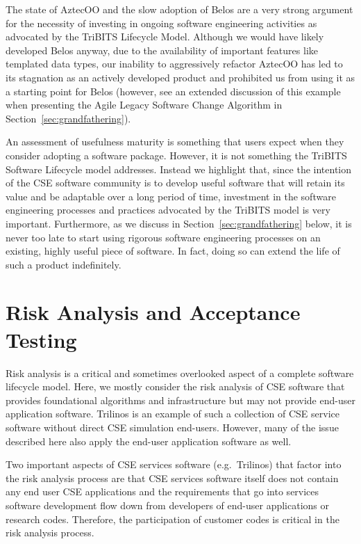 \documentclass[11pt]{SANDreport}
\begin{document}
The state of AztecOO and the slow adoption of Belos are a very strong
argument for the necessity of investing in ongoing software
engineering activities as advocated by the TriBITS Lifecycle Model.
Although we would have likely developed Belos anyway, due to the
availability of important features like templated data types, our
inability to aggressively refactor AztecOO has led to its stagnation
as an actively developed product and prohibited us from using it as a
starting point for Belos (however, see an extended discussion of this
example when presenting the Agile Legacy Software Change Algorithm in
Section~\ref{sec:grandfathering}).

An assessment of usefulness maturity is something that users expect
when they consider adopting a software package.  However, it is not
something the TriBITS Software Lifecycle model addresses.  Instead we
highlight that, since the intention of the CSE software community is
to develop useful software that will retain its value and be adaptable
over a long period of time, investment in the software engineering
processes and practices advocated by the TriBITS model is very
important.  Furthermore, as we discuss in
Section~\ref{sec:grandfathering} below, it is never too late to start
using rigorous software engineering processes on an existing, highly
useful piece of software.  In fact, doing so can extend the life of
such a product indefinitely.

%
{}\section{Risk Analysis and Acceptance Testing}
\label{sec:risk_analysis_acceptance_testing}
%

Risk analysis is a critical and sometimes overlooked aspect of a
complete software lifecycle model.  Here, we mostly consider the risk
analysis of CSE software that provides foundational algorithms and
infrastructure but may not provide end-user application software.
Trilinos is an example of such a collection of CSE service software
without direct CSE simulation end-users.  However, many of the issue
described here also apply the end-user application software as well.

Two important aspects of CSE services software (e.g.\ Trilinos) that
factor into the risk analysis process are that CSE services software
itself does not contain any end user CSE applications and the
requirements that go into services software development flow down from
developers of end-user applications or research codes.  Therefore, the
participation of customer codes is critical in the risk analysis
process.
\end{document}
